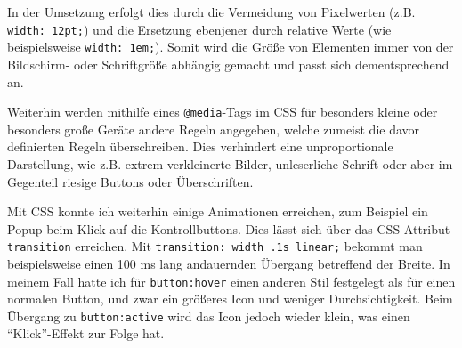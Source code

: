 In der Umsetzung erfolgt dies durch die Vermeidung von Pixelwerten (z.B. \texttt{width: 12pt;})
und die Ersetzung ebenjener durch relative Werte (wie beispielsweise \texttt{width: 1em;}).
Somit wird die Größe von Elementen immer von der Bildschirm- oder Schriftgröße abhängig
gemacht und passt sich dementsprechend an.

Weiterhin werden mithilfe eines \texttt{@media}-Tags im CSS für besonders kleine oder
besonders große Geräte andere Regeln angegeben, welche zumeist die davor definierten
Regeln überschreiben. Dies verhindert eine unproportionale Darstellung, wie z.B.
extrem verkleinerte Bilder, unleserliche Schrift oder aber im Gegenteil riesige
Buttons oder Überschriften.

Mit CSS konnte ich weiterhin einige Animationen erreichen, zum Beispiel ein Popup
beim Klick auf die Kontrollbuttons. Dies lässt sich über das CSS-Attribut \texttt{transition}
erreichen. Mit \texttt{transition: width .1s linear;} bekommt man beispielsweise
einen 100 ms lang andauernden Übergang betreffend der Breite. In meinem Fall hatte
ich für \texttt{button:hover} einen anderen Stil festgelegt als für einen normalen
Button, und zwar ein größeres Icon und weniger Durchsichtigkeit. Beim Übergang zu
\texttt{button:active} wird das Icon jedoch wieder klein, was einen ``Klick''-Effekt
zur Folge hat.

